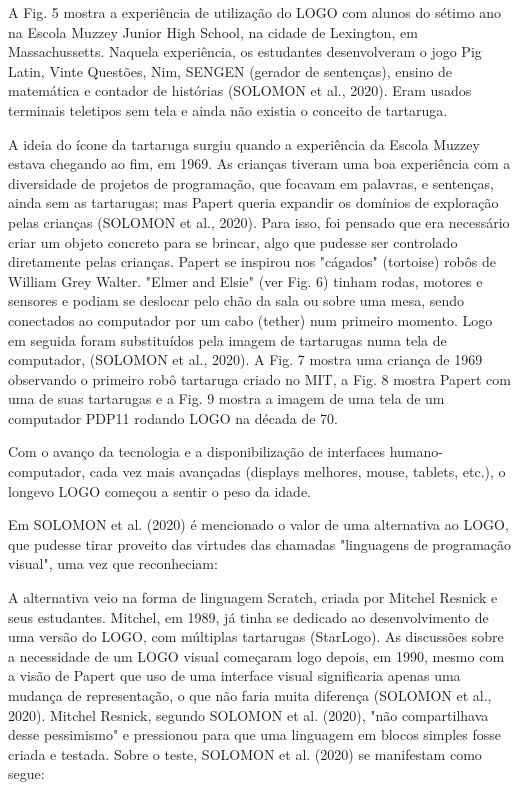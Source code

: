 A Fig. 5 mostra a experiência de utilização do LOGO com alunos do sétimo ano na Escola Muzzey Junior High School, na cidade de Lexington, em Massachussetts. Naquela experiência, os estudantes desenvolveram o jogo Pig Latin, Vinte Questões, Nim, SENGEN (gerador de sentenças), ensino de matemática e contador de histórias  (SOLOMON et al., 2020). Eram usados terminais teletipos sem tela e ainda não existia o conceito de tartaruga.

A ideia do ícone da tartaruga surgiu quando a experiência da Escola Muzzey estava chegando ao fim, em 1969. As crianças tiveram uma boa experiência com a diversidade de projetos de programação, que focavam em palavras, e sentenças, ainda sem as tartarugas; mas Papert queria expandir os domínios de exploração pelas crianças (SOLOMON et al., 2020). Para isso, foi pensado que era necessário criar um objeto concreto para se brincar, algo que pudesse ser controlado diretamente pelas crianças. Papert se inspirou nos "cágados"  (tortoise) robôs de William Grey Walter. "Elmer and Elsie" (ver Fig. 6) tinham rodas, motores e sensores e podiam se deslocar pelo chão da sala ou sobre uma mesa, sendo conectados ao computador por um cabo (tether) num primeiro momento. Logo em seguida foram substituídos pela imagem de tartarugas numa tela de computador, (SOLOMON et al., 2020). A Fig. 7 mostra uma criança de 1969 observando o primeiro robô tartaruga criado no MIT, a Fig. 8 mostra Papert com uma de suas tartarugas e a Fig. 9 mostra a imagem de uma tela de um computador PDP11 rodando LOGO na década de 70.

Com o avanço da tecnologia e a disponibilização de interfaces humano-computador, cada vez mais avançadas (displays melhores, mouse, tablets, etc.), o longevo LOGO começou a sentir o peso da idade.

Em SOLOMON et al. (2020) é mencionado o valor de uma alternativa ao LOGO, que pudesse tirar proveito das virtudes das chamadas "linguagens de programação visual", uma vez que reconheciam:


\noindent\begin{center}\mbox{\centering{}}\end{center}


A alternativa veio na forma de linguagem Scratch, criada por Mitchel Resnick e seus estudantes. Mitchel, em 1989, já tinha se dedicado ao desenvolvimento de uma versão do LOGO, com múltiplas tartarugas (StarLogo). As discussões sobre a necessidade de um  LOGO visual começaram logo depois, em 1990, mesmo com a visão de Papert que uso de uma interface visual significaria apenas uma mudança de representação, o que não faria muita diferença   (SOLOMON et al., 2020). Mitchel Resnick, segundo  SOLOMON et al. (2020), "não compartilhava desse pessimismo" e pressionou para que uma linguagem em blocos simples fosse criada e testada. Sobre o teste,  SOLOMON et al. (2020) se manifestam como segue:


